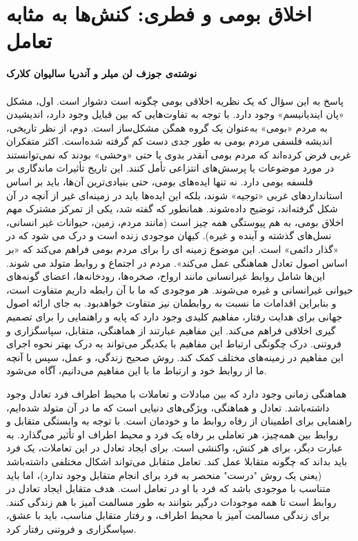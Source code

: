 \section*{اخلاق بومی و فطری: کنش‌ها به مثابه تعامل}
\label{sec:اخلاق بومی و فطری: کنش‌ها به مثابه تعامل}
\textbf{نوشته‌ی جوزف لن میلر و آندریا سالیوان کلارک}
\paragraph{}
پاسخ به این سؤال که یک نظریه اخلاقی بومی چگونه است دشوار است.
اول، مشکل «پان ایندیانیسم» وجود دارد.
با توجه به تفاوت‌هایی که بین قبایل وجود دارد، اندیشیدن به مردم «بومی» به‌عنوان یک گروه همگن مشکل‌ساز است.
دوم، از نظر تاریخی، اندیشه فلسفی مردم بومی به طور جدی دست کم گرفته شده‌است.
اکثر متفکران غربی فرض کرده‌اند که مردم بومی آنقدر بدوی یا حتی «وحشی» بودند که نمی‌توانستند در مورد موضوعات یا پرسش‌های انتزاعی تأمل کنند.
این تاریخ تأثیرات ماندگاری بر فلسفه بومی دارد.
نه تنها ایده‌های بومی، حتی بنیادی‌ترین آن‌ها، باید بر اساس استانداردهای غربی «توجیه» شوند، بلکه این ایده‌ها باید در زمینه‌ای غیر از آنچه در آن شکل گرفته‌اند، توضیح داده‌شوند.
همانطور که گفته شد، یکی از تمرکز مشترک مهم اخلاق بومی، به هم پیوستگی همه چیز است (مانند مردم، زمین، حیوانات غیر انسانی، نسل‌های گذشته و آینده و غیره).
کیهان موجودی زنده است و درک می شود که در «گذار دائمی» است.
این موضوع زمینه ای را برای مردم بومی فراهم می‌کند که «بر اساس اصول تعادل هماهنگی عمل می‌کند».
مردم در اجتماع و روابط متولد می شوند.
این‌ها شامل روابط غیرانسانی مانند ارواح، صخره‌ها، رودخانه‌ها، اعضای گونه‌های حیوانی غیرانسانی و غیره می‌شوند.
هر موجودی که ما با آن رابطه داریم متفاوت است، و بنابراین اقدامات ما نسبت به روابطمان نیز متفاوت خواهدبود.
به جای ارائه اصول جهانی برای هدایت رفتار، مفاهیم کلیدی وجود دارد که پایه و راهنمایی را برای تصمیم گیری اخلاقی فراهم می‌کند.
این مفاهیم عبارتند از هماهنگی، متقابل، سپاسگزاری و فروتنی.
درک چگونگی ارتباط این مفاهیم با یکدیگر می‌تواند به درک بهتر نحوه اجرای این مفاهیم در زمینه‌های مختلف کمک کند.
روش صحیح زندگی، و عمل، سپس با آنچه ما از روابط خود و ارتباط ما با این مفاهیم می‌دانیم، آگاه می‌شود.

هماهنگی زمانی وجود دارد که بین مبادلات و تعاملات با محیط اطراف فرد تعادل وجود داشته‌باشد.
تعادل و هماهنگی، ویژگی‌های دنیایی است که ما در آن متولد شده‌ایم، راهنمایی برای اطمینان از رفاه روابط ما و خودمان است.
با توجه به وابستگی متقابل و روابط بین همه‌چیز، هر تعاملی بر رفاه یک فرد و محیط اطراف او تأثیر می‌گذارد.
به عبارت دیگر، برای هر کنش، واکنشی است.
برای ایجاد تعادل در این تعاملات، یک فرد باید بداند که چگونه متقابلا عمل کند.
تعامل متقابل می‌تواند اشکال مختلفی داشته‌باشد (یعنی یک روش "درست" منحصر به فرد برای انجام متقابل وجود ندارد)، اما باید متناسب با موجودی باشد که فرد با او در تعامل است.
هدف متقابل ایجاد تعادل در روابط است تا همه موجودات درگیر بتوانند به طور مسالمت آمیز با هم زندگی کنند.
برای زندگی مسالمت آمیز با محیط اطراف، و رفتار متقابل مناسب، باید با عشق، سپاسگزاری و فروتنی رفتار کرد.

